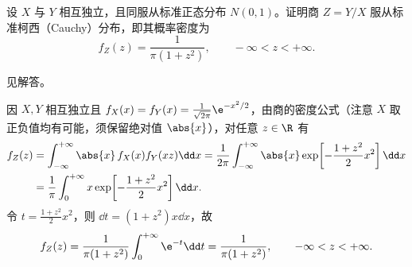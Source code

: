 \begin{exercise}
设 $X$ 与 $Y$ 相互独立，且同服从标准正态分布 $N(0,1)$。证明商 $Z=Y/X$ 服从标准柯西（Cauchy）分布，即其概率密度为
\[
  f_Z(z)=\frac{1}{\pi(1+z^2)},\qquad -\infty<z<+\infty.
\]
\begin{answer}
见解答。
\end{answer}
\begin{solution}
因 $X,Y$ 相互独立且 $f_X(x)=f_Y(x)=\frac{1}{\sqrt{2\pi}}\e^{-x^2/2}$，由商的密度公式（注意 $X$ 取正负值均有可能，须保留绝对值 $\abs{x}$），对任意 $z\in\R$ 有
\[
\begin{aligned}
  f_Z(z)&=\int_{-\infty}^{+\infty}\abs{x}\,f_X(x)f_Y(xz)\dd x
  =\frac{1}{2\pi}\int_{-\infty}^{+\infty}\abs{x}\exp\!\left[-\frac{1+z^2}{2}x^2\right]\dd x\\
  &=\frac{1}{\pi}\int_{0}^{+\infty}x\exp\!\left[-\frac{1+z^2}{2}x^2\right]\dd x.
\end{aligned}
\]
令 $t=\frac{1+z^2}{2}x^2$，则 $\dd t=(1+z^2)x\dd x$，故
\[
  f_Z(z)=\frac{1}{\pi(1+z^2)}\int_{0}^{+\infty}\e^{-t}\dd t=\frac{1}{\pi(1+z^2)},\qquad -\infty<z<+\infty.
\]
\end{solution}
\end{exercise}
